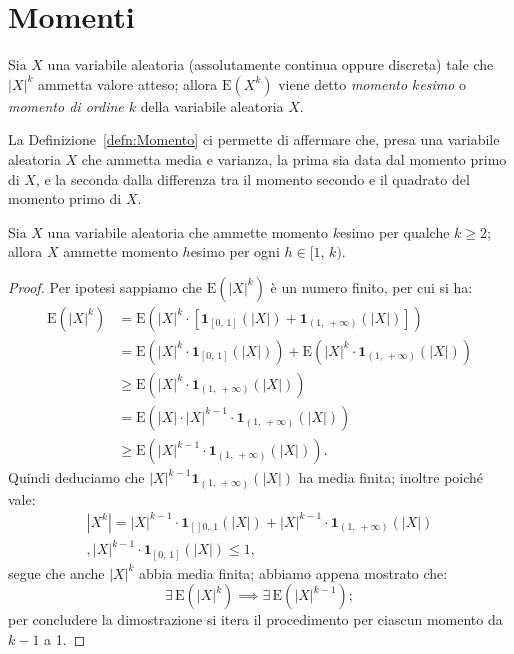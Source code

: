     \section{Momenti}
        \begin{defn}\label{defn:Momento}
            Sia $X$ una variabile aleatoria (assolutamente continua oppure discreta) tale che $|X|^k$ ammetta valore atteso; allora $\text{E}(X^k)$ viene detto \textit{momento $k$\nbdash esimo} o \textit{momento di ordine $k$} della variabile aleatoria $X$.
        \end{defn}
        \begin{obsv}
            La Definizione~\ref{defn:Momento} ci permette di affermare che, presa una variabile aleatoria $X$ che ammetta media e varianza, la prima sia data dal momento primo di $X$, e la seconda dalla differenza tra il momento secondo e il quadrato del  momento primo di $X$.
        \end{obsv}
        \begin{prty}
            Sia $X$ una variabile aleatoria che ammette momento $k$\nbdash esimo per qualche $k \geq 2$; allora $X$ ammette momento $h$\nbdash esimo per ogni $h \in [1,\,k)$.
        \end{prty}
        \begin{proof}
            Per ipotesi sappiamo che $\text{E}(|X|^k)$ è un numero finito, per cui si ha:
            \begin{align*}
                \text{E}(|X|^k) &= \text{E}\left(|X|^k\cdot\left[\mathbf{1}_{[0,\,1]}(|X|) + \mathbf{1}_{(1,\,+\infty)}(|X|)\right]\right) \\
                                &= \text{E}\left(|X|^k\cdot\mathbf{1}_{[0,\,1]}(|X|)\right) + \text{E}\left(|X|^k\cdot\mathbf{1}_{(1,\,+\infty)}(|X|)\right) \\
                                &\geq \text{E}\left(|X|^k\cdot\mathbf{1}_{(1,\,+\infty)}(|X|)\right)\\
                                &= \text{E}\left(|X|\cdot |X|^{k-1}\cdot\mathbf{1}_{(1,\,+\infty)}(|X|)\right) \\
                                &\geq \text{E}\left(|X|^{k-1}\cdot\mathbf{1}_{(1,\,+\infty)}(|X|)\right)
            .\end{align*}
            Quindi deduciamo che $|X|^{k-1}\mathbf{1}_{(1,\,+\infty)}(|X|)$ ha media finita; inoltre poiché vale:
            \begin{gather*}
                |X^k| = |X|^{k-1} \cdot \mathbf{1}_{[]0,\,1} (|X|) + |X|^{k-1}\cdot\mathbf{1}_{(1,\,+\infty)} (|X|) \\,
                |X|^{k-1}\cdot\mathbf{1}_{[0,\,1]} (|X|) \leq 1,
            \end{gather*}
            segue che anche $|X|^k$ abbia media finita; abbiamo appena mostrato che: \[
            \exists\, \text{E}(|X|^k) \implies \exists\, \text{E}(|X|^{k-1})
            ;\] per concludere la dimostrazione si itera il procedimento per ciascun momento da $k-1$ a 1.
        \end{proof}
